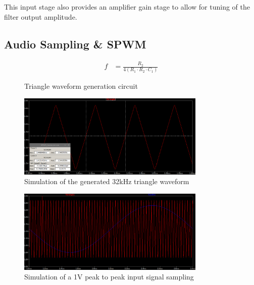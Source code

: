 \documentclass[a4paper,11pt]{article}
\begin{document}
This input stage also provides an amplifier gain stage to allow for tuning of the filter output amplitude.   

\subsection{Audio Sampling \& SPWM}

\begin{align*}
    f &= \frac{R_2}{4(R_1 \cdot R_2 \cdot C_1)} 
\end{align*}

\begin{figure}[h!]
    \centering
    \caption{Triangle waveform generation circuit}
\end{figure}

\begin{figure}[h!]
    \centering
    \includegraphics[width=0.8\textwidth]{simulation/triangle_wave.png}
    \caption{Simulation of the generated 32kHz triangle waveform}
\end{figure}


\begin{figure}[h!]
    \centering
    \includegraphics[width=0.8\textwidth]{simulation/sampling.png}
    \caption{Simulation of a 1V peak to peak input signal sampling}
\end{figure}
\end{document}
